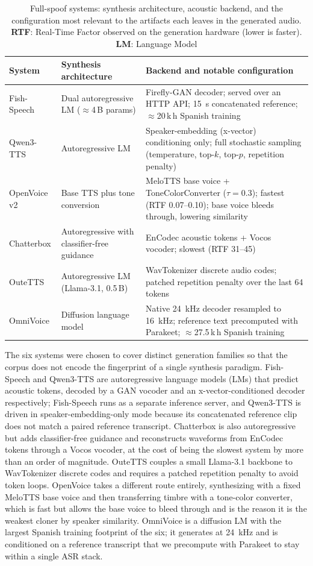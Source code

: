 \documentclass[11pt]{article}
\begin{document}
\begin{table}[t]
\centering
\caption{Full-spoof systems: synthesis architecture, acoustic backend,
and the configuration most relevant to the artifacts each leaves in the
generated audio. \textbf{RTF}: Real-Time Factor observed on the generation
hardware (lower is faster). \textbf{LM}: Language Model}
\label{tab:systems}
\small
\begin{tabular}{p{2.1cm}p{3.0cm}p{4.6cm}}
\toprule
\textbf{System} & \textbf{Synthesis architecture} & \textbf{Backend and notable configuration} \\
\midrule
Fish-Speech & Dual autoregressive LM ($\approx$4\,B params) & Firefly-GAN decoder; served over an HTTP API; \SI{15}{\second} concatenated reference; $\approx$20\,k\,h Spanish training \\
Qwen3-TTS & Autoregressive LM & Speaker-embedding (x-vector) conditioning only; full stochastic sampling (temperature, top-$k$, top-$p$, repetition penalty) \\
OpenVoice v2 & Base TTS plus tone conversion & MeloTTS base voice + ToneColorConverter ($\tau=0.3$); fastest (RTF 0.07--0.10); base voice bleeds through, lowering similarity \\
Chatterbox & Autoregressive with classifier-free guidance & EnCodec acoustic tokens + Vocos vocoder; slowest (RTF 31--45) \\
OuteTTS & Autoregressive LM (Llama-3.1, 0.5\,B) & WavTokenizer discrete audio codes; patched repetition penalty over the last 64 tokens \\
OmniVoice & Diffusion language model & Native \SI{24}{\kilo\hertz} decoder resampled to \SI{16}{\kilo\hertz}; reference text precomputed with Parakeet; $\approx$27.5\,k\,h Spanish training \\
\bottomrule
\end{tabular}
\end{table}

The six systems were chosen to cover distinct generation families so
that the corpus does not encode the fingerprint of a single synthesis
paradigm. Fish-Speech and Qwen3-TTS are autoregressive language models (LMs)
that predict acoustic tokens, decoded by a GAN vocoder and an
x-vector-conditioned decoder respectively; Fish-Speech runs as a
separate inference server, and Qwen3-TTS is driven in
speaker-embedding-only mode because its concatenated reference clip does
not match a paired reference transcript. Chatterbox is also
autoregressive but adds classifier-free guidance and reconstructs
waveforms from EnCodec tokens through a Vocos vocoder, at the cost of
being the slowest system by more than an order of magnitude. OuteTTS
couples a small Llama-3.1 backbone to WavTokenizer discrete codes and
requires a patched repetition penalty to avoid token loops. OpenVoice
takes a different route entirely, synthesizing with a fixed MeloTTS
base voice and then transferring timbre with a tone-color converter, which
is fast but allows the base voice to bleed through and is the reason it
is the weakest cloner by speaker similarity. OmniVoice is a diffusion
LM with the largest Spanish training footprint of the six;
it generates at \SI{24}{\kilo\hertz} and is conditioned on a reference
transcript that we precompute with Parakeet to stay within a single ASR
stack.
\end{document}
